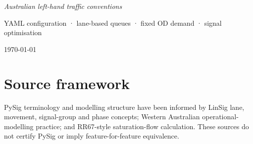 \documentclass[11pt,a4paper,oneside,openany]{book}
\begin{document}
\frontmatter
\begin{titlepage}\centering{}\vspace{8mm}{\bfseries\LARGE User Manual\par}\vspace{7mm}{\large Constructing, assigning and optimising intersection and network models\par}\vfill{\itshape Australian left-hand traffic conventions\par}YAML configuration · lane-based queues · fixed OD demand · signal optimisation\par\vspace{10mm}\today\end{titlepage}

\tableofcontents
\mainmatter















\appendix



\backmatter
\chapter*{Source framework}
PySig terminology and modelling structure have been informed by LinSig lane, movement, signal-group and phase concepts; Western Australian operational-modelling practice; and RR67-style saturation-flow calculation. These sources do not certify PySig or imply feature-for-feature equivalence.
\end{document}
